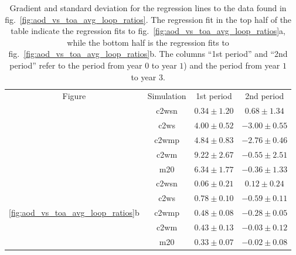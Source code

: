 \documentclass{ametsocV6.1}
\begin{document}
\begin{table}
  \centering

  \caption{Gradient and standard deviation for the regression lines to the data found in
    fig.~\ref{fig:aod_vs_toa_avg_loop_ratios}. The regression fit in the top half of the
    table indicate the regression fits to fig.~\ref{fig:aod_vs_toa_avg_loop_ratios}a, while
    the bottom half is the regression fits to fig.~\ref{fig:aod_vs_toa_avg_loop_ratios}b.
    The columns ``1st period'' and ``2nd period'' refer to the period from year \(0\) to
    year \(1\)) and the period from year \(1\) to year \(3\).}\label{tab:slope-gradients}%
  \begin{tabular}{cccc}
    Figure                                                  & Simulation  & 1st period      & 2nd period       \\
    \rowcolor{LightGray}                                    & \gls{c2wsn} & \(0.34\pm1.20\) & \(0.68\pm1.34\)  \\
    \rowcolor{LightGray}                                    & \gls{c2ws}  & \(4.00\pm0.52\) & \(-3.00\pm0.55\) \\
    \rowcolor{LightGray}                                    & \gls{c2wmp} & \(4.84\pm0.83\) & \(-2.76\pm0.46\) \\
    \rowcolor{LightGray}                                    & \gls{c2wm}  & \(9.22\pm2.67\) & \(-0.55\pm2.51\) \\
    \rowcolor{LightGray}                                    & \gls{m20}   & \(6.34\pm1.77\) & \(-0.36\pm1.33\) \\
    \multirow{5}{*}{\ref{fig:aod_vs_toa_avg_loop_ratios}b}  & \gls{c2wsn} & \(0.06\pm0.21\) & \(0.12\pm0.24\)  \\
    \multirow{-9}{*}{\ref{fig:aod_vs_toa_avg_loop_ratios}a} & \gls{c2ws}  & \(0.78\pm0.10\) & \(-0.59\pm0.11\) \\
                                                            & \gls{c2wmp} & \(0.48\pm0.08\) & \(-0.28\pm0.05\) \\
                                                            & \gls{c2wm}  & \(0.43\pm0.13\) & \(-0.03\pm0.12\) \\
                                                            & \gls{m20}   & \(0.33\pm0.07\) & \(-0.02\pm0.08\) \\
  \end{tabular}
\end{table}
\end{document}
